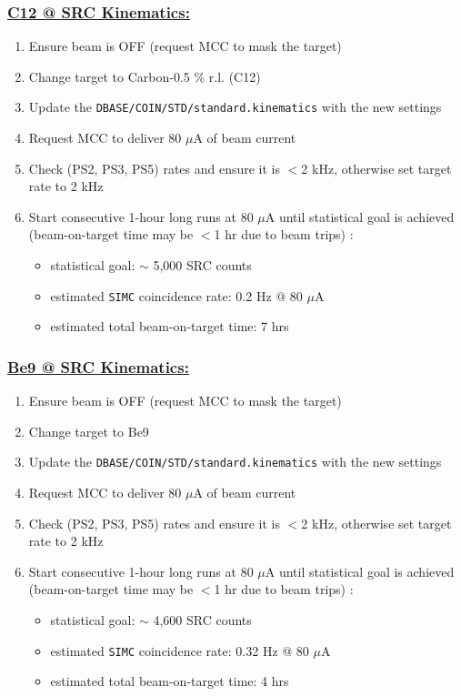 \documentclass{article}
\begin{document}
\subsubsection*{\underline{C12 @ SRC Kinematics:}}
\begin{enumerate}
\item Ensure beam is OFF (request MCC to mask the target)
\item Change target to Carbon-0.5 \% r.l. (C12)
\item Update the \texttt{DBASE/COIN/STD/standard.kinematics} with the new settings
\item Request MCC to deliver 80 $\mu$A of beam current
\item Check (PS2, PS3, PS5) rates and ensure it is $<$2 kHz, otherwise set target rate to 2 kHz
\item Start consecutive 1-hour long runs at 80 $\mu$A until statistical goal is achieved \\ (beam-on-target time may be $<$1 hr due to beam trips) :
\begin{itemize}
    \item statistical goal: $\sim$ 5,000 SRC counts
    \item estimated \texttt{SIMC} coincidence rate: 0.2 Hz @ 80 $\mu$A
    \item estimated total beam-on-target time: 7 hrs
\end{itemize}
\end{enumerate}

\subsubsection*{\underline{Be9 @ SRC Kinematics:}}
\begin{enumerate}
\item Ensure beam is OFF (request MCC to mask the target)
\item Change target to Be9
\item Update the \texttt{DBASE/COIN/STD/standard.kinematics} with the new settings
\item Request MCC to deliver 80 $\mu$A of beam current
\item Check (PS2, PS3, PS5) rates and ensure it is $<$2 kHz, otherwise set target rate to 2 kHz
\item Start consecutive 1-hour long runs at 80 $\mu$A until statistical goal is achieved \\ (beam-on-target time may be $<$1 hr due to beam trips) :
\begin{itemize}
    \item statistical goal: $\sim$ 4,600 SRC counts
    \item estimated \texttt{SIMC} coincidence rate: 0.32 Hz @ 80 $\mu$A
    \item estimated total beam-on-target time: 4 hrs
\end{itemize}
\end{enumerate}
\end{document}
